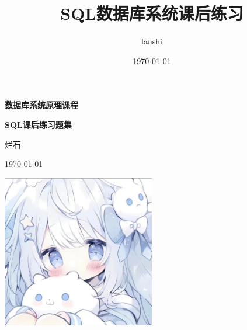 \documentclass[12pt,a4paper]{article}
\title{SQL数据库系统课后练习}
\author{lanshi}
\date{\today}
\begin{document}
\begin{titlepage}
    \centering
    \vspace*{\fill}
    {\LARGE\bfseries 数据库系统原理课程\par}
    \vspace{2cm}
    {\Huge\bfseries SQL课后练习题集\par}
    \vspace{2cm}
    {\Large 烂石\par}
    \vspace{1cm}
    {\large \today \par}
    \vspace{4cm}
    \includegraphics[width=0.5\textwidth]{image/logo.jpg}
    \vspace*{\fill}
    \thispagestyle{empty} %
    \newpage
\end{titlepage}

\end{document}

